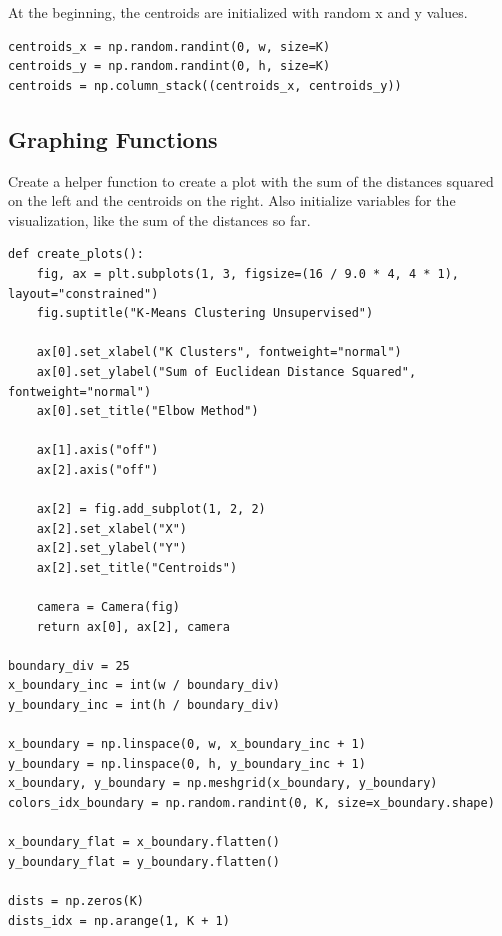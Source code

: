 \documentclass[openany]{book}
\begin{document}
At the beginning, the centroids are initialized with random x and y values.

\begin{tcolorbox}
\tiny
\begin{verbatim}
centroids_x = np.random.randint(0, w, size=K)
centroids_y = np.random.randint(0, h, size=K)
centroids = np.column_stack((centroids_x, centroids_y))
\end{verbatim}
\end{tcolorbox}

    \subsection{Graphing Functions}\label{graphing-functions}

Create a helper function to create a plot with the sum of the distances
squared on the left and the centroids on the right. Also initialize
variables for the visualization, like the sum of the distances so far.

\begin{tcolorbox}
\tiny
\begin{verbatim}
def create_plots():
    fig, ax = plt.subplots(1, 3, figsize=(16 / 9.0 * 4, 4 * 1), layout="constrained")
    fig.suptitle("K-Means Clustering Unsupervised")

    ax[0].set_xlabel("K Clusters", fontweight="normal")
    ax[0].set_ylabel("Sum of Euclidean Distance Squared", fontweight="normal")
    ax[0].set_title("Elbow Method")

    ax[1].axis("off")
    ax[2].axis("off")

    ax[2] = fig.add_subplot(1, 2, 2)
    ax[2].set_xlabel("X")
    ax[2].set_ylabel("Y")
    ax[2].set_title("Centroids")

    camera = Camera(fig)
    return ax[0], ax[2], camera

boundary_div = 25
x_boundary_inc = int(w / boundary_div)
y_boundary_inc = int(h / boundary_div)

x_boundary = np.linspace(0, w, x_boundary_inc + 1)
y_boundary = np.linspace(0, h, y_boundary_inc + 1)
x_boundary, y_boundary = np.meshgrid(x_boundary, y_boundary)
colors_idx_boundary = np.random.randint(0, K, size=x_boundary.shape)

x_boundary_flat = x_boundary.flatten()
y_boundary_flat = y_boundary.flatten()

dists = np.zeros(K)
dists_idx = np.arange(1, K + 1)
\end{verbatim}
\end{tcolorbox}
\end{document}
